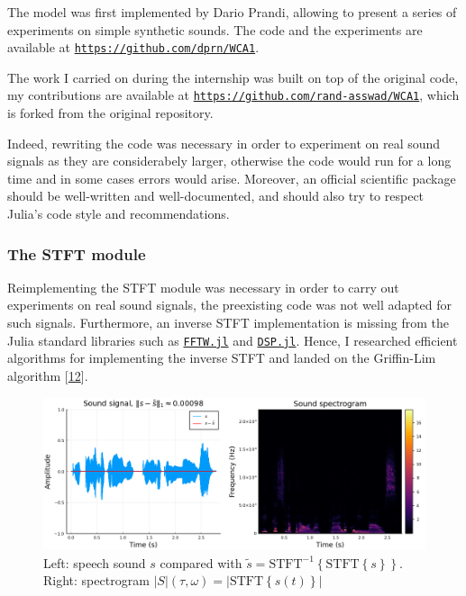 \documentclass[american,]{article}
\theoremstyle{definition}
\theoremstyle{definition}
\theoremstyle{definition}
\theoremstyle{remark}
\begin{document}
The model was first implemented by Dario Prandi,
allowing to present a series of experiments on simple synthetic sounds.
The code and the experiments are available at
\href{https://github.com/dprn/WCA1}{\texttt{https://github.com/dprn/WCA1}}.

The work I carried on during the internship was built on top of the original code,
my contributions are available at
\href{https://github.com/rand-asswad/WCA1}{\texttt{https://github.com/rand-asswad/WCA1}},
which is forked from the original repository.

Indeed, rewriting the code was necessary in order to experiment
on real sound signals as they are considerabely larger,
otherwise the code would run for a long time and in some cases
errors would arise.
Moreover, an official scientific package should be well-written
and well-documented, and should also try to respect Julia's
code style and recommendations.

\hypertarget{the-stft-module}{%
\subsubsection{The STFT module}\label{the-stft-module}}

Reimplementing the STFT module was necessary in order to carry out
experiments on real sound signals, the preexisting code was not well
adapted for such signals.
Furthermore, an inverse STFT implementation is missing from the Julia
standard libraries such as \href{https://juliapackages.com/p/fftw}{\texttt{FFTW.jl}}
and \href{https://juliapackages.com/p/dsp}{\texttt{DSP.jl}}.
Hence, I researched efficient algorithms for implementing the inverse STFT
and landed on the Griffin-Lim algorithm {[}\protect\hyperlink{ref-griffin1983}{12}{]}.

\begin{figure}
\centering
\includegraphics{img/stft_istft.png}
\caption{Left: speech sound \(s\) compared with \(\tilde s=\mathrm{STFT}^{-1}\left\{\mathrm{STFT}\left\{s\right\}\right\}\). Right: spectrogram \(\left\lvert S\right\rvert(\tau,\omega)=\left\lvert\mathrm{STFT}\left\{s(t)\right\}\right\rvert\)}
\end{figure}
\end{document}

